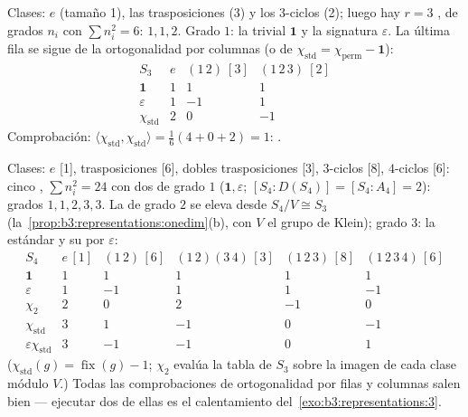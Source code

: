 \begin{example}[La tabla de $S_3$]\label{ex:b3:representations:s3}
Clases: $e$ (tamaño 1), las trasposiciones (3) y los $3$-ciclos (2);
luego hay $r
= 3$ , de grados $n_i$
con $\sum n_i^2 = 6$: $1, 1,
2$. Grado $1$: la trivial $\mathbf 1$ y la signatura $\varepsilon$. La
última fila se sigue de la ortogonalidad por columnas (o de
$\chi_{\mathrm{std}} = \chi_{\mathrm{perm}} - \mathbf 1$):
\[
\begin{array}{c|ccc}
S_3 & e & (1\,2)\ [3] & (1\,2\,3)\ [2]\\
\hline
\mathbf 1 & 1 & 1 & 1\\
\varepsilon & 1 & -1 & 1\\
\chi_{\mathrm{std}} & 2 & 0 & -1
\end{array}
\]
Comprobación: $\langle\chi_{\mathrm{std}},\chi_{\mathrm{std}}\rangle =
\frac{1}{6}(4 + 0 + 2) = 1$:
.
\end{example}

\begin{example}[La tabla de $S_4$]\label{ex:b3:representations:s4}
Clases: $e$ [1], trasposiciones [6], dobles trasposiciones [3],
$3$-ciclos [8], $4$-ciclos [6]: cinco
, $\sum n_i^2 =
24$ con dos de grado $1$ ($\mathbf 1, \varepsilon$; $[S_4 :
D(S_4)] = [S_4 : A_4] = 2$): grados $1, 1, 2, 3, 3$. La de grado $2$ se
eleva desde $S_4/V \cong S_3$
(la~\cref{prop:b3:representations:onedim}(b), con $V$ el grupo de
Klein); grado $3$: la
 estándar y su
 por
$\varepsilon$:
\[
\begin{array}{c|ccccc}
S_4 & e\,[1] & (1\,2)\,[6] & (1\,2)(3\,4)\,[3] &
(1\,2\,3)\,[8] & (1\,2\,3\,4)\,[6]\\
\hline
\mathbf 1 & 1 & 1 & 1 & 1 & 1\\
\varepsilon & 1 & -1 & 1 & 1 & -1\\
\chi_2 & 2 & 0 & 2 & -1 & 0\\
\chi_{\mathrm{std}} & 3 & 1 & -1 & 0 & -1\\
\varepsilon\chi_{\mathrm{std}} & 3 & -1 & -1 & 0 & 1
\end{array}
\]
($\chi_{\mathrm{std}}(g) = \operatorname{fix}(g) - 1$;
$\chi_2$ evalúa la tabla de $S_3$ sobre la imagen de cada clase módulo
$V$.) Todas las comprobaciones de ortogonalidad por filas y columnas
salen bien --- ejecutar dos de ellas es el calentamiento
del~\cref{exo:b3:representations:3}.
\end{example}

